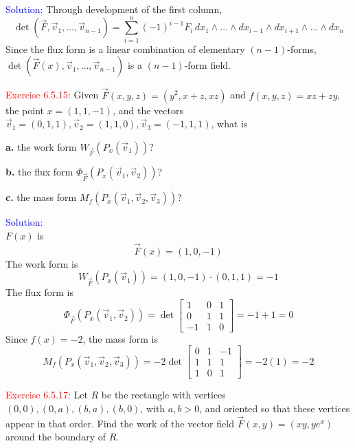 \documentclass[12pt]{article}
\begin{document}
\bigskip

\textcolor{blue}{Solution:}
    Through development of the first column,
    \[
        \det(\vec F,\vec v_1,\dots,\vec v_{n-1})
        = \sum_{i=1}^n (-1)^{i-1} F_i 
            \,dx_1 \wedge \hdots  \wedge dx_{i-1} \wedge 
            dx_{i+1} \wedge \hdots \wedge dx_n
    \]
    Since the flux form is a linear combination of elementary $(n-1)$-forms,
    $\det(\vec F(x),\vec v_1,\dots,\vec v_{n-1})$ is a $(n-1)$-form field.
\newpage







\textcolor{red}{Exercise 6.5.15:}
Given $\vec F(x,y,z) = (y^2,x+z,xz)$ and $f(x,y,z) = xz+zy$, the point $x= (1,1,-1)$, and the vectors $\vec v_1=(0,1,1),\vec v_2=(1,1,0),\vec v_3=(-1,1,1)$, what is

\textbf{a.} the work form $W_{\vec F}(P_x(\vec v_1))$?


\textbf{b.} the flux form $\Phi_{\vec F}(P_x(\vec v_1,\vec v_2))$?

\textbf{c.} the mass form $M_f(P_x(\vec v_1,\vec v_2,\vec v_3))$?


\bigskip

\textcolor{blue}{Solution:} \\
    $F(x)$ is
    \[
        \vec F(x) = (1, 0, -1)
    \]
    The work form is
    \[
        W_{\vec F}(P_x(\vec v_1)) 
        = (1, 0, -1) \cdot (0, 1, 1)
        = -1
    \]
    The flux form is
    \[
        \Phi_{\vec F}(P_x(\vec v_1,\vec v_2)) 
        = \det 
        \begin{bmatrix}
            1 & 0 & 1\\
            0 & 1 & 1\\
            -1 & 1 & 0
        \end{bmatrix}
        = -1 + 1
        = 0
    \]
    Since $f(x) = -2$, the mass form is
    \[
        M_f(P_x(\vec v_1,\vec v_2,\vec v_3))
        = -2 \det 
        \begin{bmatrix}
            0 & 1 & -1\\
            1 & 1 & 1\\
            1 & 0 & 1
        \end{bmatrix}
        = -2(1)
        = -2
    \]
\newpage





\textcolor{red}{Exercise 6.5.17:}
Let $R$ be the rectangle with vertices $(0,0),(0,a),(b,a),(b,0)$, with $a,b>0$, and oriented so that these vertices appear in that order. Find the work of the  vector field $\vec F(x,y) = (xy,ye^x)$ around the boundary of $R$.
\end{document}
